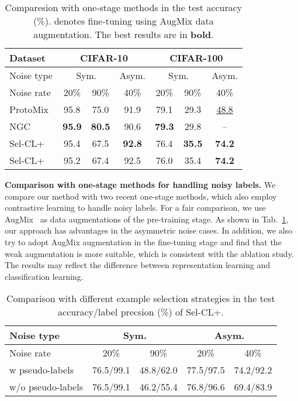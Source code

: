 \documentclass[10pt,twocolumn,letterpaper]{article}
\newcommand{\myPara}[1]{\vspace{.05in}\noindent\textbf{#1}}
\begin{document}
\begin{table}[t]
	\caption{Comparesion with one-stage methods in the test accuracy (\%).  denotes fine-tuning using AugMix data augmentation. The best results are in \textbf{bold}.} 
	\vspace{-5pt}\centering
	\small
	\setlength\tabcolsep{5pt}
	\begin{tabular}{l|c|c|c|c|c|c}
		\hline \multirow{1}{*}{Dataset} & \multicolumn{3}{c}{CIFAR-10} & \multicolumn{3}{|c}{CIFAR-100} \\
		\hline \multirow{1}{*}{Noise type} & \multicolumn{2}{c}{Sym.} & \multicolumn{1}{|c}{Asym.} & \multicolumn{2}{|c}{Sym.} & \multicolumn{1}{|c}{Asym.}\\
		\hline
		Noise rate & 
		20\% & 90\% & 40\% & 20\% & 90\% &  40\% \\
		\hline			
		ProtoMix~\cite{li2020learning} & 95.8 & 75.0 & 91.9 & 79.1 & 29.3 & \underline{48.8} \\		
		NGC~\cite{Zhi2021ICCV} & \textbf{95.9} & \textbf{80.5} & 90.6 & \textbf{79.3} & 29.8 & --\\
		\hline
Sel-CL+ & 95.4 & 67.5 & \textbf{92.8} & 76.4 & \textbf{35.5} &  \textbf{74.2} \\
		Sel-CL+ & 95.2 & 67.4 & 92.5 & 76.0 & 35.4 & \textbf{74.2} \\
		\hline
	\end{tabular}
	\label{one-stage}
\end{table}


\myPara{Comparison with one-stage methods for handling noisy labels.}	
We compare our method with two recent one-stage methods, which also employ contrastive learning to handle noisy labels. For a fair comparison, we use AugMix~\cite{HendrycksMCZGL20} as data augmentations of the pre-training stage. As shown in Tab.~\ref{one-stage}, our approach has advantages in the asymmetric noise cases. In addition, we also try to adopt AugMix augmentation in the fine-tuning stage and find that the weak augmentation is more suitable, which is consistent with the ablation study. The results may reflect the difference between representation learning and classification learning.

\begin{table}[t]
	\caption{Comparison with different example selection strategies in the test accuracy/label precsion (\%) of Sel-CL+.} \vspace{-5pt}
	\centering
	\small
	\setlength\tabcolsep{4pt}
	\begin{tabular}{l|c|c|c|c}
		\hline \multirow{1}{*}{Noise type} & \multicolumn{2}{c}{Sym.} & \multicolumn{2}{|c}{Asym.} \\
		\hline
		Noise rate & 
		20\% & 90\% & 20\% & 40\% \\
		\hline
		w pseudo-labels & 76.5/99.1 & 48.8/62.0 & 77.5/97.5 & 74.2/92.2 \\
		w/o pseudo-labels & 76.5/99.1 & 46.2/55.4 & 76.8/96.6 & 69.4/83.9 \\
		\hline
	\end{tabular}
	\label{pseudo-labels}
	\vspace{-6pt}
\end{table}
\end{document}
